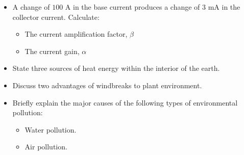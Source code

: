 \documentclass{article}
\begin{document}
\begin{itemize}
\item A change of $ 100$ A in the base current produces a change of $ 3$ mA in the collector current. Calculate:
 \begin{itemize}
\item The current amplification factor, $ \beta$
\item The current gain, $ \alpha $
\end{itemize}
\item State three sources of heat energy within the interior of the earth. 
\item Discuss two advantages of windbreaks to plant environment. 
\item Briefly explain the major causes of the following types of environmental pollution:
 \begin{itemize}
\item Water pollution. 
\item  Air pollution.
\end{itemize}
\end{itemize}
\end{document}
